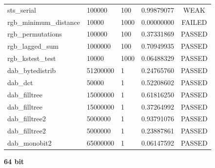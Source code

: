 \documentclass[titlepage, 11pt]{article}
\begin{document}
\begin{table}[!htb]
\begin{tabular}{l|l|l|c|c}
sts\_serial & 100000 & 100 & 0.99879077 & WEAK \\
rgb\_minimum\_distance & 10000 & 1000 & 0.00000000 & FAILED \\
rgb\_permutations & 100000 & 100 & 0.37331869 & PASSED \\
rgb\_lagged\_sum & 1000000 & 100 & 0.70949935 & PASSED \\
rgb\_kstest\_test & 10000 & 1000 & 0.06488329 & PASSED \\
dab\_bytedistrib & 51200000 & 1 & 0.24765760 & PASSED \\
dab\_dct & 50000 & 1 & 0.52208602 & PASSED \\
dab\_filltree & 15000000 & 1 & 0.61816250 & PASSED \\
dab\_filltree & 15000000 & 1 & 0.37264992 & PASSED \\
dab\_filltree2 & 5000000 & 1 & 0.93791076 & PASSED \\
dab\_filltree2 & 5000000 & 1 & 0.23887861 & PASSED \\
dab\_monobit2 & 65000000 & 1 & 0.06147592 & PASSED
\end{tabular}
\end{table}

\newpage
\noindent \textbf{64 bit}
\end{document}
